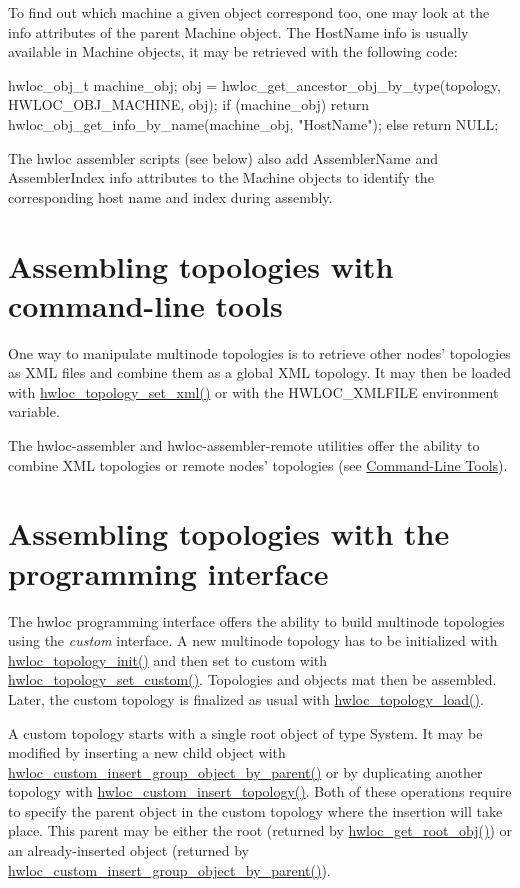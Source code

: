 To find out which machine a given object correspond too, one may look at the info attributes of the parent Machine object. The {\ttfamily HostName} info is usually available in Machine objects, it may be retrieved with the following code: 
\begin{DoxyPre}
  hwloc\_obj\_t machine\_obj;
  obj = hwloc\_get\_ancestor\_obj\_by\_type(topology, HWLOC\_OBJ\_MACHINE, obj);
  if (machine\_obj)
    return hwloc\_obj\_get\_info\_by\_name(machine\_obj, "HostName");
  else
    return NULL;
\end{DoxyPre}
 The hwloc assembler scripts (see below) also add {\ttfamily AssemblerName} and {\ttfamily AssemblerIndex} info attributes to the Machine objects to identify the corresponding host name and index during assembly.\hypertarget{a00006_multinode_tools}{}\section{Assembling topologies with command-\/line tools}\label{a00006_multinode_tools}
One way to manipulate multinode topologies is to retrieve other nodes' topologies as XML files and combine them as a global XML topology. It may then be loaded with \hyperlink{a00044_ga93efcc8a962afe1ed23393700682173f}{hwloc\_\-topology\_\-set\_\-xml()} or with the HWLOC\_\-XMLFILE environment variable.

The hwloc-\/assembler and hwloc-\/assembler-\/remote utilities offer the ability to combine XML topologies or remote nodes' topologies (see \hyperlink{a00002}{Command-\/Line Tools}).\hypertarget{a00006_multinode_interface}{}\section{Assembling topologies with the programming interface}\label{a00006_multinode_interface}
The hwloc programming interface offers the ability to build multinode topologies using the {\itshape custom\/} interface. A new multinode topology has to be initialized with \hyperlink{a00043_ga5c2d6f476af87005c7bd0811d4548b9f}{hwloc\_\-topology\_\-init()} and then set to custom with \hyperlink{a00044_ga12024fec46f9368fb8fc5c624089c5ec}{hwloc\_\-topology\_\-set\_\-custom()}. Topologies and objects mat then be assembled. Later, the custom topology is finalized as usual with \hyperlink{a00043_ga91e2e6427b95fb7339c99dbbef996e71}{hwloc\_\-topology\_\-load()}.

A custom topology starts with a single root object of type System. It may be modified by inserting a new child object with \hyperlink{a00051_gac1037fe389bfa7c2bf0e3739b7e20844}{hwloc\_\-custom\_\-insert\_\-group\_\-object\_\-by\_\-parent()} or by duplicating another topology with \hyperlink{a00051_ga59ccf6a63cb23d63940e8b782059d9cb}{hwloc\_\-custom\_\-insert\_\-topology()}. Both of these operations require to specify the parent object in the custom topology where the insertion will take place. This parent may be either the root (returned by \hyperlink{a00053_gadbf58f6e187efbdb3cd9a8e30311b7d7}{hwloc\_\-get\_\-root\_\-obj()}) or an already-\/inserted object (returned by \hyperlink{a00051_gac1037fe389bfa7c2bf0e3739b7e20844}{hwloc\_\-custom\_\-insert\_\-group\_\-object\_\-by\_\-parent()}).

